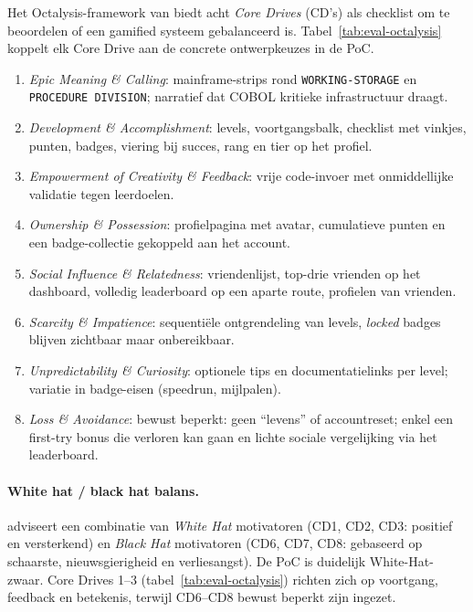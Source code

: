 Het Octalysis-framework van \textcite{Chou2015} biedt acht \textit{Core Drives} (CD's) als checklist om te beoordelen of een gamified systeem gebalanceerd is.
Tabel~\ref{tab:eval-octalysis} koppelt elk Core Drive aan de concrete ontwerpkeuzes in de PoC.

\begin{table}[H]
\centering
\small
\begin{enumerate}[label=\textbf{CD\arabic*}, leftmargin=*, itemsep=0.55em, topsep=0.4em]
    \item \textit{Epic Meaning \& Calling}: mainframe-strips rond \texttt{WORKING-STORAGE} en \texttt{PROCEDURE DIVISION}; narratief dat COBOL kritieke infrastructuur draagt.
    \item \textit{Development \& Accomplishment}: levels, voortgangsbalk, checklist met vinkjes, punten, badges, viering bij succes, rang en tier op het profiel.
    \item \textit{Empowerment of Creativity \& Feedback}: vrije code-invoer met onmiddellijke validatie tegen leerdoelen.
    \item \textit{Ownership \& Possession}: profielpagina met avatar, cumulatieve punten en een badge-collectie gekoppeld aan het account.
    \item \textit{Social Influence \& Relatedness}: vriendenlijst, top-drie vrienden op het dashboard, volledig leaderboard op een aparte route, profielen van vrienden.
    \item \textit{Scarcity \& Impatience}: sequentiële ontgrendeling van levels, \textit{locked} badges blijven zichtbaar maar onbereikbaar.
    \item \textit{Unpredictability \& Curiosity}: optionele tips en documentatielinks per level; variatie in badge-eisen (speedrun, mijlpalen).
    \item \textit{Loss \& Avoidance}: bewust beperkt: geen ``levens'' of accountreset; enkel een first-try bonus die verloren kan gaan en lichte sociale vergelijking via het leaderboard.
\end{enumerate}
\caption{Mapping van Octalysis Core Drives op ontwerpkeuzes in \textit{Learn COBOL}}
\label{tab:eval-octalysis}
\end{table}

\paragraph{White hat / black hat balans.}
\textcite{Chou2015} adviseert een combinatie van \textit{White Hat} motivatoren (CD1, CD2, CD3: positief en versterkend) en \textit{Black Hat} motivatoren (CD6, CD7, CD8: gebaseerd op schaarste, nieuwsgierigheid en verliesangst). 
De PoC is duidelijk White-Hat-zwaar. Core Drives 1--3 (tabel~\ref{tab:eval-octalysis}) richten zich op voortgang, feedback en betekenis, terwijl CD6--CD8 bewust beperkt zijn ingezet. 

